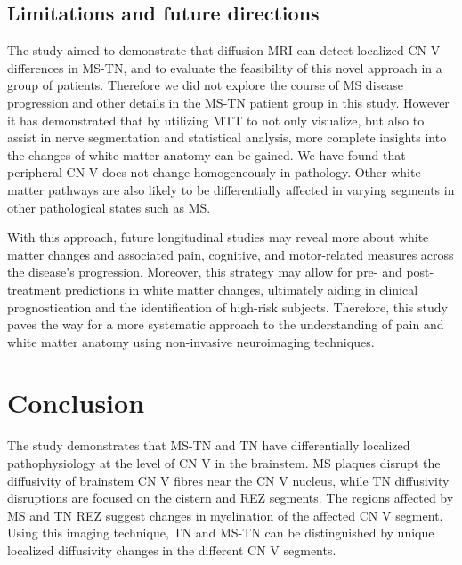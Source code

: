 \subsection{Limitations and future directions}
The study aimed to demonstrate that diffusion MRI can detect localized CN V differences in MS-TN, and to evaluate the feasibility of this novel approach in a group of patients. Therefore we did not explore the course of MS disease progression and other details in the MS-TN patient group in this study. However it has demonstrated that by utilizing MTT to not only visualize, but also to assist in nerve segmentation and statistical analysis, more complete insights into the changes of white matter anatomy can be gained. We have found that peripheral CN V does not change homogeneously in pathology. Other white matter pathways are also likely to be differentially affected in varying segments in other pathological states such as MS. 

With this approach, future longitudinal studies may reveal more about white matter changes and associated pain, cognitive, and motor-related measures across the disease’s progression. Moreover, this strategy may allow for pre- and post-treatment predictions in white matter changes, ultimately aiding in clinical prognostication and the identification of high-risk subjects. Therefore, this study paves the way for a more systematic approach to the understanding of pain and white matter anatomy using non-invasive neuroimaging techniques.

\section{Conclusion}
The study demonstrates that MS-TN and TN have differentially localized pathophysiology at the level of CN V in the brainstem. MS plaques disrupt the diffusivity of brainstem CN V fibres near the CN V nucleus, while TN diffusivity disruptions are focused on the cistern and REZ segments. The regions affected by MS and TN REZ suggest changes in myelination of the affected CN V segment. Using this imaging technique, TN and MS-TN can be distinguished by unique localized diffusivity changes in the different CN V segments.